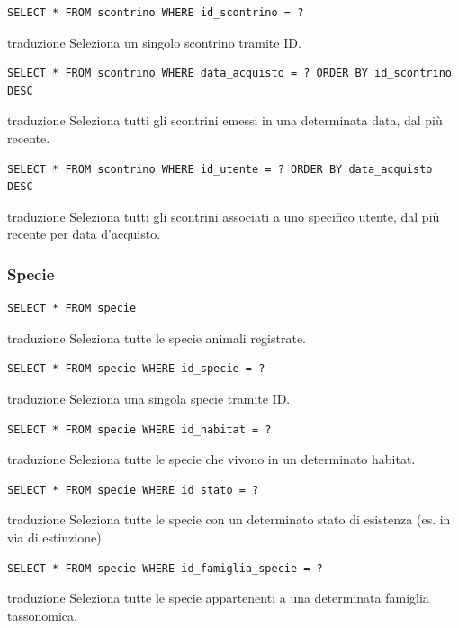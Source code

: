 \documentclass[12pt,a4paper]{report}
\begin{document}
\begin{lstlisting}[style=sqlstyle]
SELECT * FROM scontrino WHERE id_scontrino = ?
\end{lstlisting}
traduzione {Seleziona un singolo scontrino tramite ID.}

\begin{lstlisting}[style=sqlstyle]
SELECT * FROM scontrino WHERE data_acquisto = ? ORDER BY id_scontrino DESC
\end{lstlisting}
traduzione {Seleziona tutti gli scontrini emessi in una determinata data, dal più recente.}

\begin{lstlisting}[style=sqlstyle]
SELECT * FROM scontrino WHERE id_utente = ? ORDER BY data_acquisto DESC
\end{lstlisting}
traduzione {Seleziona tutti gli scontrini associati a uno specifico utente, dal più recente per data d'acquisto.}

\subsubsection*{Specie}
\begin{lstlisting}[style=sqlstyle]
SELECT * FROM specie
\end{lstlisting}
traduzione {Seleziona tutte le specie animali registrate.}

\begin{lstlisting}[style=sqlstyle]
SELECT * FROM specie WHERE id_specie = ?
\end{lstlisting}
traduzione {Seleziona una singola specie tramite ID.}

\begin{lstlisting}[style=sqlstyle]
SELECT * FROM specie WHERE id_habitat = ?
\end{lstlisting}
traduzione {Seleziona tutte le specie che vivono in un determinato habitat.}

\begin{lstlisting}[style=sqlstyle]
SELECT * FROM specie WHERE id_stato = ?
\end{lstlisting}
traduzione {Seleziona tutte le specie con un determinato stato di esistenza (es. in via di estinzione).}

\begin{lstlisting}[style=sqlstyle]
SELECT * FROM specie WHERE id_famiglia_specie = ?
\end{lstlisting}
traduzione {Seleziona tutte le specie appartenenti a una determinata famiglia tassonomica.}
\end{document}
